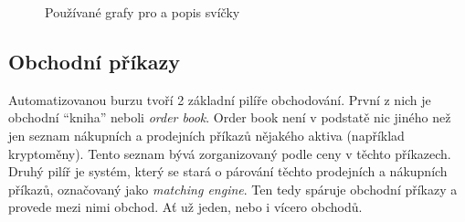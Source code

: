 \begin{figure}[ht]
    \centering
    \qquad

    \qquad

    \caption{Používané grafy pro a popis svíčky}
    \label{fig:most-used-charts}
\end{figure}


\subsection{Obchodní příkazy}
\label{subsec:market-trade-orders}
Automatizovanou burzu tvoří 2 základní pilíře obchodování. První z nich je obchodní \enquote{kniha} neboli \emph{order book}. Order book není v podstatě nic
jiného než jen seznam nákupních a prodejních příkazů nějakého aktiva (například kryptoměny). Tento seznam bývá zorganizovaný podle ceny v těchto příkazech.
Druhý pilíř je systém, který se stará o párování těchto prodejních a nákupních příkazů, označovaný jako \emph{matching engine}. Ten tedy spáruje obchodní příkazy
a provede mezi nimi obchod. Ať už jeden, nebo i vícero obchodů.

